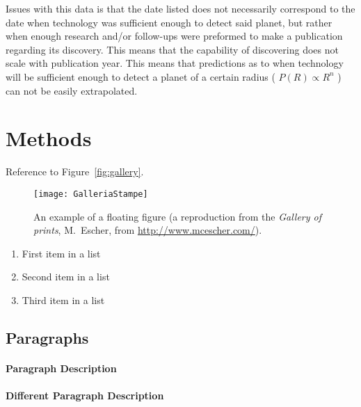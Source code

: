 \documentclass[
10pt, %
a4paper, %
oneside, %
headinclude,footinclude, %
BCOR5mm, %
]{scrartcl}
\begin{document}
Issues with this data is that the date listed does not necessarily correspond to the date when technology was sufficient enough to detect said planet, but rather when enough research and/or follow-ups were preformed to make a publication regarding its discovery. This means that the capability of discovering does not scale with publication year. This means that predictions as to when technology will be sufficient enough to detect a planet of a certain radius ( $P(R)\propto{}R^{n}$ ) can not be easily extrapolated. 
\section{Methods}

Reference to Figure~\vref{fig:gallery}. %

\begin{figure}[tb]
\centering 
\texttt{[image: GalleriaStampe]} 
\caption[An example of a floating figure]{An example of a floating figure (a reproduction from the \emph{Gallery of prints}, M.~Escher, from \url{http://www.mcescher.com/}).} %
\label{fig:gallery} 
\end{figure}

\lipsum[5] %

\begin{enumerate}[noitemsep] %
\item First item in a list
\item Second item in a list
\item Third item in a list
\end{enumerate}


\subsection{Paragraphs}

\lipsum[6] %

\paragraph{Paragraph Description} \lipsum[7] %

\paragraph{Different Paragraph Description} \lipsum[8] %
\end{document}
